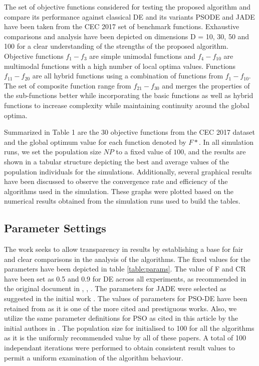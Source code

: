 \documentclass[a4paper,twoside]{article}
\begin{document}
The set of objective functions considered for testing the proposed algorithm and compare its performance against classical DE and its variants PSODE and JADE have been taken from the CEC 2017 set of benchmark functions. Exhaustive comparisons and analysis have been depicted on dimensions D = 10, 30, 50 and 100 for a clear understanding of the strengths of the proposed algorithm. Objective functions $f_1 - f_3$ are simple unimodal functions and $f_4 - f_{10}$ are multimodal functions with a high number of local optima values. Functions $f_{11} - f_{20}$ are all hybrid functions using a combination of functions from $f_1 - f_{10}$. The set of composite function range from $f_{21} - f_{30}$ and merges the properties of the sub-functions better while incorporating the basic functions as well as hybrid functions to increase complexity while maintaining continuity around the global optima.

Summarized in Table 1 are the 30 objective functions from the CEC 2017 dataset and the global optimum value for each function denoted by $F*$. In all simulation runs, we set the population size $NP$ to a fixed value of $100$, and the results are shown in a tabular structure depicting the best and average values of the population individuals for the simulations. Additionally, several graphical results have been discussed to observe the convergence rate and efficiency of the algorithms used in the simulation. These graphs were plotted based on the numerical results obtained from the simulation runs used to build the tables.

\subsection{Parameter Settings}

The work seeks to allow transparency in results by establishing a base for fair and clear comparisons in the analysis of the algorithms. The fixed values for the parameters have been depicted in table \ref{table:params}. The value of F and CR have been set as 0.5 and 0.9 for DE across all experiments, as recommended in the original document in \cite{storn1995differential}, \cite{Mezura-Montes}, \cite{brest2006self}. The parameters for JADE were selected as suggested in the initial work \cite{zhang2009jade}. The values of parameters for PSO-DE have been retained from \cite{psodeLiu} as it is one of the more cited and prestiguous works. Also, we utilize the same parameter definitions for PSO as cited in this article by the initial authors in \cite{review07particleswarm}. The population size for initialised to 100 for all the algorithms as it is the uniformly recommended value by all of these papers. A total of 100 independant iterations were performed to obtain consistent result values to permit a uniform examination of the algorithm behaviour.
\end{document}
